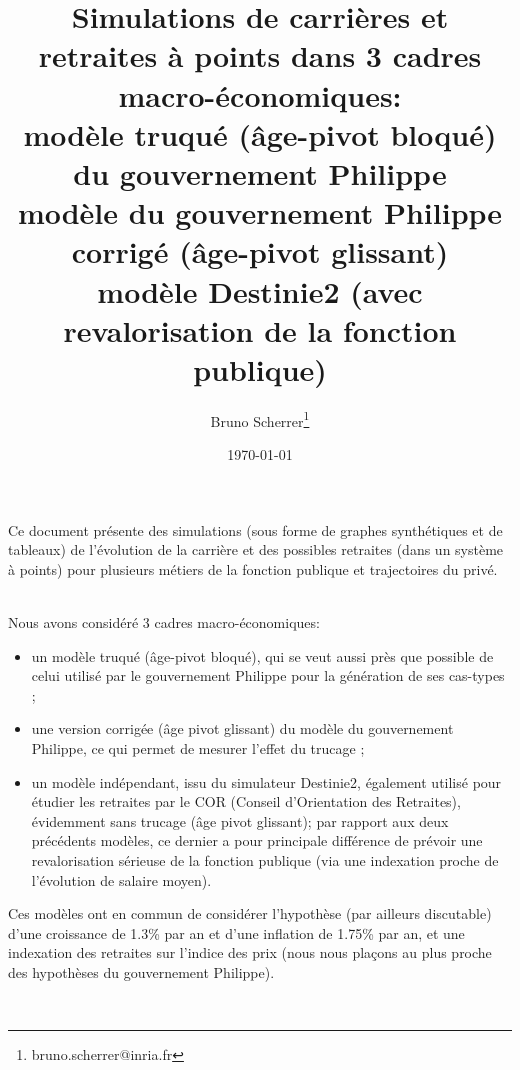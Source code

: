 \documentclass[a4paper,10pt]{report}
\title{Simulations de carrières et retraites à points dans 3 cadres macro-économiques:\\
  modèle truqué (âge-pivot bloqué) du gouvernement Philippe \\
  modèle du gouvernement Philippe corrigé (âge-pivot glissant)\\
  modèle Destinie2 (avec revalorisation de la fonction publique)}
\author{Bruno Scherrer\footnote{bruno.scherrer@inria.fr}}
\date{\today}
\begin{document}
\makeatletter
\renewcommand\tableofcontents{%
    \@starttoc{toc}%
}
\makeatother

\dominitoc


\maketitle

\doclicenseThis



Ce document présente des simulations (sous forme de graphes synthétiques et de tableaux) de l'évolution de la carrière et des possibles retraites (dans un système à points) pour plusieurs métiers de la fonction publique et trajectoires du privé.

~\\

Nous avons considéré 3 cadres macro-économiques:
\begin{itemize}
\item un modèle truqué (âge-pivot bloqué), qui se veut aussi près que possible de celui utilisé par le gouvernement Philippe pour la génération de ses cas-types ;
\item une version corrigée (âge pivot glissant) du modèle du gouvernement Philippe, ce qui permet de mesurer l'effet du trucage ;
\item un modèle indépendant, issu du simulateur Destinie2, également utilisé pour étudier les retraites par le COR (Conseil d'Orientation des Retraites), évidemment sans trucage (âge pivot glissant); par rapport aux deux précédents modèles, ce dernier a pour principale différence de prévoir une revalorisation sérieuse de la fonction publique (via une indexation proche de l'évolution de salaire moyen).
\end{itemize}
Ces modèles ont en commun de considérer l'hypothèse (par ailleurs discutable) d'une croissance de 1.3\% par an et d'une inflation de 1.75\% par an, et une indexation des retraites sur l'indice des prix (nous nous plaçons au plus proche des hypothèses du gouvernement Philippe).

~\\
\end{document}
